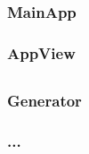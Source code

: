 





\subsection{}

\subsubsection{MainApp}

\subsubsection{AppView}




\subsection{}

\subsubsection{Generator}

\subsubsection{...}
